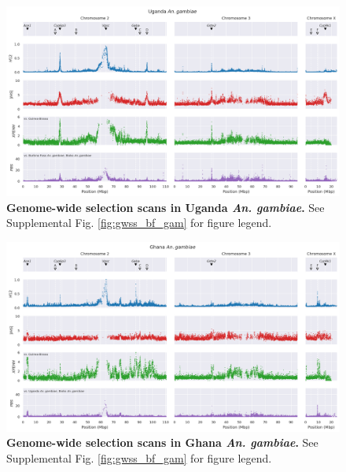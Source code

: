 \documentclass[a4paper,11pt,abstracton,hidelinks]{scrartcl}
\begin{document}
\begin{landscape}
\begin{figure}[t!]
	\begin{center}
		\includegraphics*[width=1.05\linewidth,center]{artwork/gwss_ug_gam_gw_bf_gam_gq_gam.png}
	\end{center}
	\caption[Genome-wide selection scans in Uganda \textit{An. gambiae}]{
	\textbf{Genome-wide selection scans in Uganda \textit{An. gambiae}.} 
	See Supplemental Fig. \ref{fig:gwss_bf_gam} for figure legend.
	} 
	\label{fig:gwss_ug_gam}
\end{figure}


\begin{figure}[t!]
	\begin{center}
		\includegraphics*[width=1.05\linewidth,center]{artwork/gwss_gh_gam_gw_ug_gam_gq_gam.png}
	\end{center}
	\caption[Genome-wide selection scans in Ghana \textit{An. gambiae}]{
	\textbf{Genome-wide selection scans in Ghana \textit{An. gambiae}.} 
	See Supplemental Fig. \ref{fig:gwss_bf_gam} for figure legend.
	} 
	\label{fig:gwss_gh_gam}
\end{figure}



\end{landscape}
\end{document}
